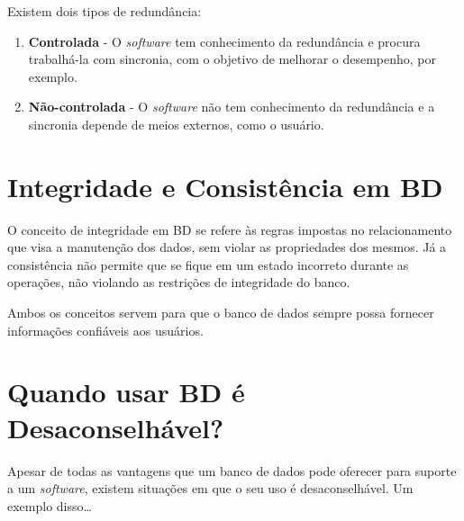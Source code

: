 \documentclass[12pt]{article}
\begin{document}
Existem dois tipos de redundância:
\begin{enumerate}
    \item \textbf{Controlada} - O \textit{software} tem conhecimento da redundância e procura trabalhá-la com sincronia, com o objetivo de melhorar o desempenho, por exemplo.
    \item \textbf{Não-controlada} - O \textit{software} não tem conhecimento da redundância e a sincronia depende de meios externos, como o usuário.
\end{enumerate}

\section{Integridade e Consistência em BD}
O conceito de integridade em BD se refere às regras impostas no relacionamento que visa a manutenção dos dados, sem violar as propriedades dos mesmos. Já a consistência não permite que se fique em um estado incorreto durante as operações, não violando as restrições de integridade do banco.

Ambos os conceitos servem para que o banco de dados sempre possa fornecer informações confiáveis aos usuários.

\section{Quando usar BD é Desaconselhável?}
Apesar de todas as vantagens que um banco de dados pode oferecer para suporte a um \textit{software}, existem situações em que o seu uso é desaconselhável.
Um exemplo disso\dots
\end{document}
